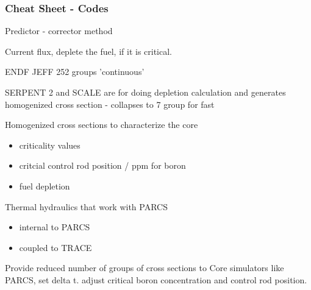 \documentclass[9pt]{beamer}
\begin{document}
\begin{frame}
\frametitle{Cheat Sheet - Codes}
Predictor - corrector method

Current flux, deplete the fuel, if it is critical.


ENDF JEFF 252 groups 'continuous'


SERPENT 2 and SCALE are for doing depletion calculation and
generates homogenized cross section -
collapses to 7 group for fast


Homogenized cross sections to characterize the core
\begin{itemize}
    \item criticality values
    \item critcial control rod position / ppm for boron
    \item fuel depletion
\end{itemize}

Thermal hydraulics that work with PARCS
\begin{itemize}
    \item internal to PARCS
    \item coupled to TRACE
\end{itemize}


Provide reduced number of groups of cross sections to
Core simulators like PARCS, set delta t. 
adjust critical boron concentration and control rod position.
\end{frame}
\end{document}
